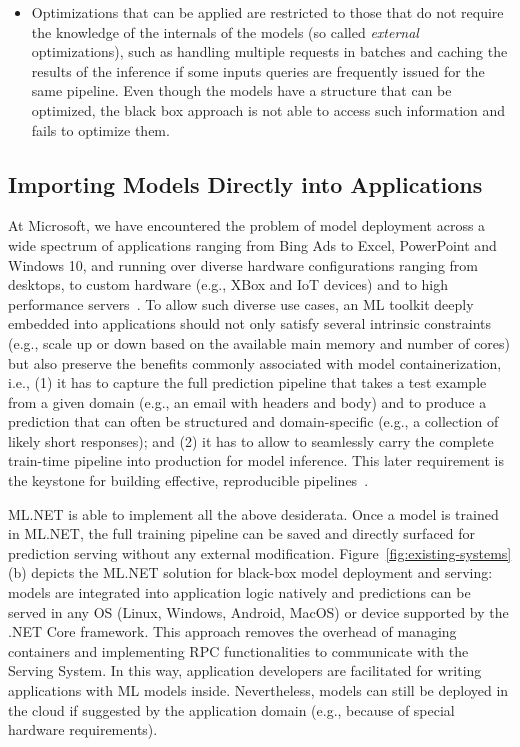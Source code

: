 \documentclass[11pt]{article}
\newcommand{\mlnet}{ML.NET\xspace}
\newcommand{\msft}{Microsoft\xspace}
\newcommand{\stitle}[1]{\noindent{\bf #1}}
\begin{document}
{\begin{itemize}
\begin{itemize}
        \item \stitle{Limited Optimizations:} Optimizations that can be applied are restricted to those that do not require the knowledge of the internals of the models (so called \emph{external} optimizations), such as handling multiple requests in batches and caching the results of the inference if some inputs queries are frequently issued for the same pipeline. Even though the models have a structure that can be optimized, the black box approach is not able to access such information and fails to optimize them.
    \end{itemize}
\end{itemize}
}

\subsection{Importing Models Directly into Applications}
\label{sec:mlnet}

At \msft, we have encountered the problem of model deployment across a wide spectrum of applications ranging from Bing Ads to Excel, PowerPoint and Windows 10, and running over diverse hardware configurations ranging from desktops, to custom hardware (e.g., XBox and IoT devices) and to high performance servers~\cite{windows-ai-platform, bing-ads, xbox}.
To allow such diverse use cases, an ML toolkit deeply embedded into applications should not only satisfy several intrinsic constraints (e.g., scale up or down based on the available main memory and number of cores) but also preserve the benefits commonly associated with model containerization, i.e., (1) it has to capture the full prediction pipeline that takes a test example from a given domain (e.g., an email with headers and body) and to produce a prediction that can often be structured and domain-specific (e.g., a collection of likely short responses); and (2) it has to allow to seamlessly carry the complete train-time pipeline into production for model inference.
This later requirement is the keystone for building effective, reproducible pipelines~\cite{google-rules-of-ml}.

\mlnet is able to implement all the above desiderata.
Once a model is trained in \mlnet, the full training pipeline can be saved and directly surfaced for prediction serving without any external modification.
Figure~\ref{fig:existing-systems}(b) depicts the \mlnet solution for black-box model deployment and serving: models are integrated into application logic natively and predictions can be served in any OS (Linux, Windows, Android, MacOS) or device supported by the .NET Core framework.
This approach removes the overhead of managing containers and implementing RPC functionalities to communicate with the Serving System. 
In this way, application developers are facilitated for writing applications with ML models inside. 
Nevertheless, models can still be deployed in the cloud if suggested by the application domain (e.g., because of special hardware requirements).
\end{document}

